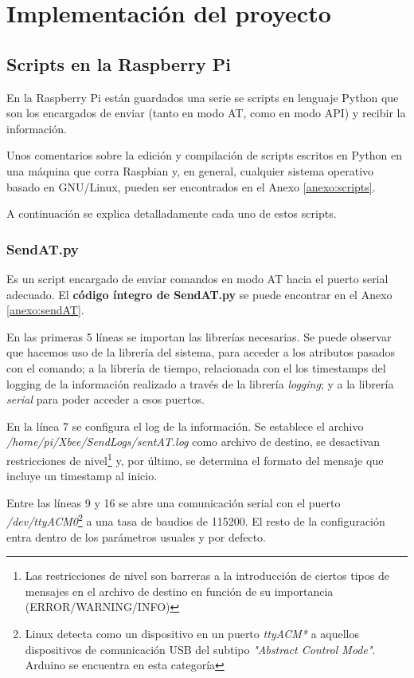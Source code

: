 
\chapter{Implementación del proyecto}

\section{Scripts en la Raspberry Pi}

En la Raspberry Pi están guardados una serie se scripts en lenguaje Python que son los encargados de enviar (tanto en modo AT, como en modo API) y recibir la información.

Unos comentarios sobre la edición y compilación de scripts escritos en Python en una máquina que corra Raspbian y, en general, cualquier sistema operativo basado en GNU/Linux, pueden ser encontrados en el Anexo \ref{anexo:scripts}.

A continuación se explica detalladamente cada uno de estos scripts.

\subsection{SendAT.py}\label{subsubsec:sendat}

Es un script encargado de enviar comandos en modo AT hacia el puerto serial adecuado. El \textbf{código íntegro de SendAT.py} se puede encontrar en el Anexo \ref{anexo:sendAT}.

En las primeras 5 líneas se importan las librerías necesarias. Se puede observar que hacemos uso de la librería del sistema, para acceder a los atributos pasados con el comando; a la librería de tiempo, relacionada con el los timestamps del logging de la información realizado a través de la librería \textit{logging}; y a la librería \textit{serial} para poder acceder a esos puertos.

En la línea 7 se configura el log de la información. Se establece el archivo \textit{/home/pi/Xbee/SendLogs/sentAT.log} como archivo de destino, se desactivan restricciones de nivel\footnote{Las restricciones de nivel son barreras a la introducción de ciertos tipos de mensajes en el archivo de destino en función de su importancia (ERROR/WARNING/INFO)} y, por último, se determina el formato del mensaje que incluye un timestamp al inicio.

Entre las líneas 9 y 16 se abre una comunicación serial con el puerto \textit{/dev/ttyACM0}\footnote{Linux detecta como un dispositivo en un puerto \textit{ttyACM*} a aquellos dispositivos de comunicación USB del subtipo \textit{"Abstract Control Mode"}. Arduino se encuentra en esta categoría} a una tasa de baudios de 115200. El resto de la configuración entra dentro de los parámetros usuales y por defecto.


